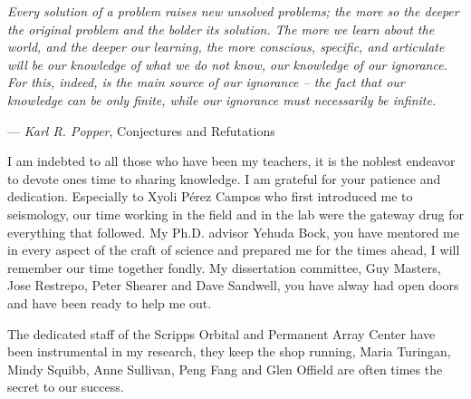 \begin{frontmatter}
 \begin{myepigraph} %
 \vfil
\noindent
\emph{Every solution of a problem raises new unsolved problems; the more so the deeper the original problem and the bolder its solution. The more we learn about the world, and the deeper our learning, the more conscious, specific, and articulate will be our knowledge of what we do not know, our knowledge of our ignorance. For this, indeed, is the main source of our ignorance -- the fact that our knowledge can be only finite, while our ignorance must necessarily be infinite.}
 \vspace{10mm}
 
 
\begin{raggedright}
\hfill --- \emph{Karl R. Popper}, Conjectures and Refutations
\end{raggedright}
 \end{myepigraph}


%
\tableofcontents
\listoffigures  %
\listoftables   %



%
%
\begin{acknowledgements}
I am indebted to all those who have been my teachers, it is the noblest endeavor to devote ones time to sharing knowledge. I am grateful for your patience and dedication. Especially to Xyoli P\'erez Campos who first introduced me to seismology, our time working in the field and in the lab were the gateway drug for everything that followed. My Ph.D. advisor Yehuda Bock, you have mentored me in every aspect of the craft of science and prepared me for the times ahead, I will remember our time together fondly. My dissertation committee, Guy Masters, Jose Restrepo, Peter Shearer and Dave Sandwell, you have alway had open doors and have been ready to help me out.

The dedicated staff of the Scripps Orbital and Permanent Array Center have been instrumental in my research, they keep the shop running, Maria Turingan, Mindy Squibb, Anne Sullivan, Peng Fang and Glen Offield are often times the secret to our success.


\end{acknowledgements}
\end{frontmatter}

